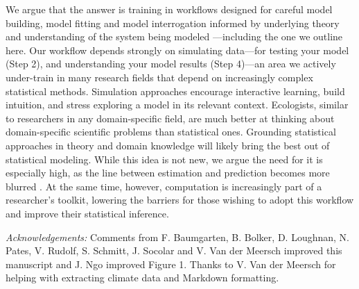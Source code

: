 \documentclass[11pt]{article}
\begin{document}
We argue that the answer is training in workflows designed for careful model building, model fitting and model interrogation informed by underlying theory and understanding of the system being modeled \citep{betanworkflow,gelman2020bayesian,vandeschoot2021}---including the one we outline here. Our workflow depends strongly on simulating data---for testing your model (Step 2), and understanding your model results (Step 4)---an area we actively under-train in many research fields that depend on increasingly complex statistical methods. Simulation approaches encourage interactive learning, build intuition, and stress exploring a model in its relevant context. Ecologists, similar to researchers in any domain-specific field, are much better at thinking about domain-specific scientific problems than statistical ones. Grounding statistical approaches in theory and domain knowledge will likely bring the best out of statistical modeling. While this idea is not new, we argue the need for it is especially high, as the line between estimation and prediction becomes more blurred \citep{shmueli2010explain}. At the same time, however, computation is increasingly part of a researcher's toolkit, lowering the barriers for those wishing to adopt this workflow and improve their statistical inference. 

\emph{Acknowledgements:} Comments from F. Baumgarten, B. Bolker, D. Loughnan, N. Pates, V. Rudolf, S. Schmitt, J. Socolar and V. Van der Meersch improved this manuscript and J. Ngo improved Figure 1. Thanks to V. Van der Meersch for helping with extracting climate data and Markdown formatting. 

\end{document}
